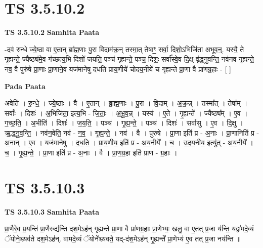 \documentclass[17pt]{extarticle}
\begin{document}

\section{ TS 3.5.10.2 }

\textbf{TS 3.5.10.2 } \newline
\textbf{Samhita Paata} \newline

-दव॑ रुन्धे ज्ये॒ष्ठा वा ए॒तान् ब्रा᳚ह्म॒णाः पु॒रा विदाम॑क्र॒न् तस्मा॒त् तेषाꣳ॒॒ सर्वा॒ दिशो॒ऽभिजि॑ता अभूव॒न्॒. यस्यै॒ ते गृ॒ह्यन्ते॒ ज्यैष्ठ्य॑मे॒व ग॑च्छत्य॒भि दिशो॑ जयति॒ पञ्च॑ गृह्यन्ते॒ पञ्च॒ दिशः॒ सर्वा᳚स्वे॒व दि॒क्ष्-वृ॑द्ध्नुवन्ति॒ नव॑नव गृह्यन्ते॒ नव॒ वै पुरु॑षे प्रा॒णाः प्रा॒णाने॒व यज॑मानेषु दधति प्राय॒णीये॑ चोदय॒नीये॑ च गृह्यन्ते प्रा॒णा वै प्रा॑णग्र॒हाः - [  ] \newline

\textbf{Pada Paata} \newline

अवेति॑ । रु॒न्धे॒ । ज्ये॒ष्ठाः । वै । ए॒तान् । ब्रा॒ह्म॒णाः । पु॒रा । वि॒दाम् । अ॒क्र॒न्न् । तस्मा᳚त् । तेषा᳚म् । सर्वाः᳚ । दिशः॑ । अ॒भिजि॑ता॒ इत्य॒भि - जि॒ताः॒ । अ॒भू॒व॒न्न् । यस्य॑ । ए॒ते । गृ॒ह्यन्ते᳚ । ज्यैष्ठ्य᳚म् । ए॒व । ग॒च्छ॒ति॒ । अ॒भीति॑ । दिशः॑ । ज॒य॒ति॒ । पञ्च॑ । गृ॒ह्य॒न्ते॒ । पञ्च॑ । दिशः॑ । सर्वा॑सु । ए॒व । दि॒क्षु । ऋ॒द्ध्नु॒व॒न्ति॒ । नव॑न॒वेति॒ नव॑ - न॒व॒ । गृ॒ह्य॒न्ते॒ । नव॑ । वै । पुरु॑षे । प्रा॒णा इति॑ प्र - अ॒नाः । प्रा॒णानिति॑ प्र - अ॒नान् । ए॒व । यज॑मानेषु । द॒ध॒ति॒ । प्रा॒य॒णीय॒ इति॑ प्र - अ॒य॒नीये᳚ । च॒ । उ॒द॒य॒नीय॒ इत्यु॑त् - अ॒य॒नीये᳚ । च॒ । गृ॒ह्य॒न्ते॒ । प्रा॒णा इति॑ प्र - अ॒नाः । वै । प्रा॒ण॒ग्र॒हा इति॑ प्राण - ग्र॒हाः ।  \newline





\section{ TS 3.5.10.3 }

\textbf{TS 3.5.10.3 } \newline
\textbf{Samhita Paata} \newline

प्रा॒णैरे॒व प्र॒यन्ति॑ प्रा॒णैरुद्य॑न्ति दश॒मेऽह॑न् गृह्यन्ते प्रा॒णा वै प्रा॑णग्र॒हाः प्रा॒णेभ्यः॒ खलु॒ वा ए॒तत् प्र॒जा य॑न्ति॒ यद्वा॑मदे॒व्यं ॅयोने॒श्च्यव॑ते दश॒मेऽह॑न्. वामदे॒व्यं ॅयोने᳚श्च्यवते॒ यद्-द॑श॒मेऽह॑न् गृ॒ह्यन्ते᳚ प्रा॒णेभ्य॑ ए॒व तत् प्र॒जा नय॑न्ति ॥ \newline
\end{document}
